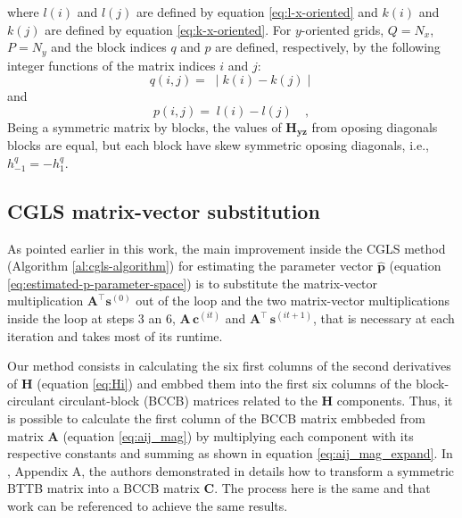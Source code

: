 where $l(i)$ and $l(j)$ are defined by equation \ref{eq:l-x-oriented} 
and $k(i)$ and $k(j)$ are defined by equation \ref{eq:k-x-oriented}.
For $y$-oriented grids, $Q = N_{x}$, $P = N_{y}$ and the block indices
$q$ and $p$ are defined, respectively, by the following integer functions 
of the matrix indices $i$ and $j$:
\begin{equation}
	q(i, j) = \; \mid k(i) - k(j) \mid
	\label{eq:Hyz-q-y-oriented}
\end{equation}
and
\begin{equation}
	p(i, j) = \; l(i) - l(j) \quad ,
	\label{eq:Hyz-p-y-oriented}
\end{equation}
Being a symmetric matrix by blocks, the values of $\mathbf{H_{yz}}$ from oposing diagonals blocks are equal, but each block have skew symmetric oposing diagonals, i.e., $h^{q}_{-1} = - h^{q}_{1}$.

\subsection{CGLS matrix-vector substitution}

As pointed earlier in this work, the main improvement inside the CGLS method (Algorithm \ref{al:cgls-algorithm}) for estimating the parameter vector $\hat{\mathbf{p}}$ (equation \ref{eq:estimated-p-parameter-space}) is to substitute the matrix-vector multiplication $\mathbf{A}^{\top} \mathbf{s}^{(0)}$ out of the loop and the two matrix-vector multiplications inside the loop at steps 3 an 6, $\mathbf{A} \, \mathbf{c}^{(it)}$ and $\mathbf{A}^{\top} \, \mathbf{s}^{(it + 1)}$, that is necessary at each iteration and takes most of its runtime.

Our method consists in calculating the six first columns of the second derivatives of $\mathbf{H}$ (equation \ref{eq:Hi}) and embbed them into the first six columns of the block-circulant circulant-block (BCCB) matrices related to the $\mathbf{H}$ components. Thus, it is possible to calculate the first column of the BCCB matrix embbeded from matrix $\mathbf{A}$ (equation \ref{eq:aij_mag}) by multiplying each component with its respective constants and summing as shown in equation \ref{eq:aij_mag_expand}. In \cite{takahashi2020convolutional}, Appendix A, the authors demonstrated in details how to transform a symmetric BTTB matrix into a BCCB matrix $\mathbf{C}$. The process here is the same and that work can be referenced to achieve the same results.

